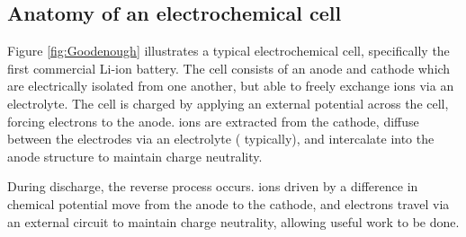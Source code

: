\subsection{Anatomy of an electrochemical cell}
Figure \ref{fig:Goodenough} illustrates a typical electrochemical cell, specifically the first commercial Li-ion battery.
The cell consists of an anode and cathode which are electrically isolated from one another, but able to freely exchange ions via an electrolyte.
The cell is charged by applying an external potential across the cell, forcing electrons to the anode.
 ions are extracted from the  cathode, diffuse between the electrodes via an electrolyte ( typically), and intercalate into the anode structure to maintain charge neutrality.

During discharge, the reverse process occurs.
 ions driven by a difference in chemical potential move from the anode to the cathode, and electrons travel via an external circuit to maintain charge neutrality, allowing useful work to be done.


